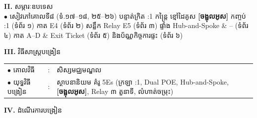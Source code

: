 \documentclass[a4paper,10pt]{article}
\newcommand{\en}[1]{{\TimesEn #1}}
\newcommand{\cnum}[1]{{\fontsize{10.5pt}{12pt}\selectfont\ding{\numexpr181+#1\relax}}\hspace{0.15em}}
\begin{document}
{\vspace{2pt}

\textbf{II.} {\muol សម្ភារៈឧបទេស}\\[1pt]
\hspace*{0.55cm}$\bullet$ \hspace{0.35cm} សៀវភៅគោលទី៨ (ទំ.១៧–១៨, ២៥–២៦) បន្ទាត់ក្រិត \en{1:1} កន្ត្រៃ ខ្មៅដៃគូស \textbf{[ចង្អុលអូស]} កញ្ចប់ \en{1:1} (ទំព័រ ១) កាត \en{E4} (ទំព័រ ២) សន្លឹក \en{Relay E5} (ទំព័រ ៣) ផ្ទាំង \en{Hub-and-Spoke} \& \cnum{1}--\cnum{5} (ទំព័រ ៤) កាត \en{A--D} \& \en{Exit Ticket} (ទំព័រ ៥) និងប័ណ្ណកិច្ចការផ្ទះ (ទំព័រ ៦)

\vspace{2pt}

\textbf{III.} {\muol វិធីសាស្រ្តបង្រៀន}\\[1pt]
\hspace*{0.45cm}%
\begin{tabular}{@{}l l L{14.85cm}@{}}
  $\bullet$ \hspace{0.25cm} គោលវិធី & : & សិស្សមជ្ឈមណ្ឌល \\
  $\bullet$ \hspace{0.25cm} យុទ្ធវិធីបង្រៀន & : & ស្ថាបនានិយម គំរូ \en{5Es} (ក្រឡា \en{1:1}, \en{Dual POE}, \en{Hub-and-Spoke}, \textbf{[ចង្អុលអូស]}, \en{Relay} ៣ តួនាទី, លំហាត់ចម្រុះ) \\
\end{tabular}
}

\vspace{2pt}

\textbf{IV.} {\muol ដំណើរការបង្រៀន}

\vspace{1pt}
\end{document}
